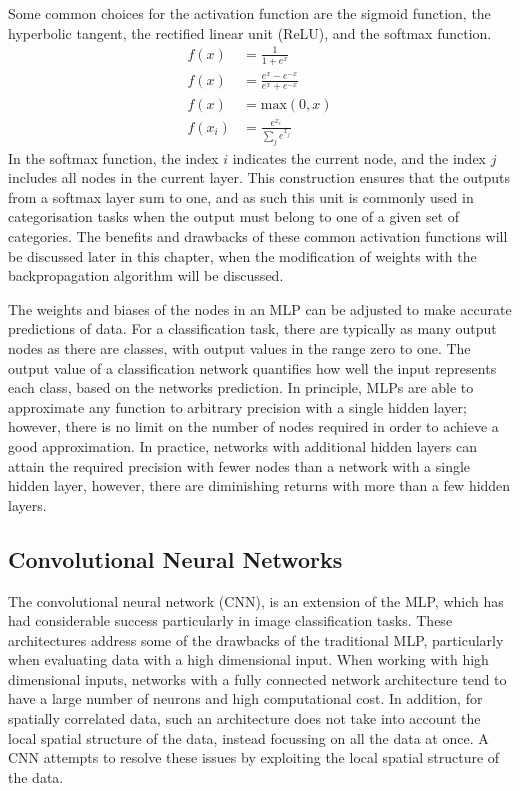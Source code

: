 \noindent
Some common choices for the activation function are the sigmoid function, the
hyperbolic tangent, the rectified linear unit (ReLU), and the softmax 
function\cite{Lecun2015, He2015, Szegedy2015}.
\begin{align*}
	\tag{Sigmoid} f(x) &= \frac{1}{1+e^x} \\
	\tag{Tanh}    f(x) &= \frac{e^x - e^{-x}}{e^x+e^{-x}} \\
	\tag{ReLU}    f(x) &= \mbox{max}\left( 0, x \right) \\
	\tag{Softmax} f(x_i) &= \frac{e^{x_i}}{\displaystyle\sum_j e^{x_j}}
\end{align*}
In the softmax function, the index $i$ indicates the current node, and the index
$j$ includes all nodes in the current layer. This construction ensures that 
the outputs from a softmax layer sum to one, and as such this unit is commonly 
used in categorisation tasks when the output must belong to one of a given set 
of categories. The benefits and drawbacks of these common activation functions 
will be discussed later in this chapter, when the modification of weights 
with the backpropagation algorithm will be discussed.

The weights and biases of the nodes in an MLP can be adjusted to make accurate 
predictions of data. For a classification task, there are typically as many
output nodes as there are classes, with output values in the range zero to one. 
The output value of a classification network quantifies how well the input
represents each class, based on the networks prediction. In principle, MLPs 
are able to approximate any function to arbitrary precision with a 
single hidden layer\cite{Cybenko1989ApproximationBS}; however, there is no 
limit on the number of nodes required in order to achieve a good 
approximation. In practice, networks with additional hidden layers can attain 
the required precision with fewer nodes than a network with a single hidden 
layer, however, there are diminishing returns with more than a few hidden 
layers\cite{Reed1999, Lecun2015}.

\subsection{Convolutional Neural Networks}
The convolutional neural network (CNN)\cite{Jackel2008, Szegedy2015, 5537907}, 
is an extension of the MLP, which has had considerable success particularly in 
image classification tasks. These architectures address some of the drawbacks 
of the traditional MLP, particularly when evaluating data with a high 
dimensional input. When working with high dimensional inputs, networks with a 
fully connected network architecture tend to have a large number of neurons 
and high computational cost. In addition, for spatially correlated data, such 
an architecture does not take into account the local spatial structure of the 
data, instead focussing on all the data at once. A CNN attempts to resolve 
these issues by exploiting the local spatial structure of the data.

